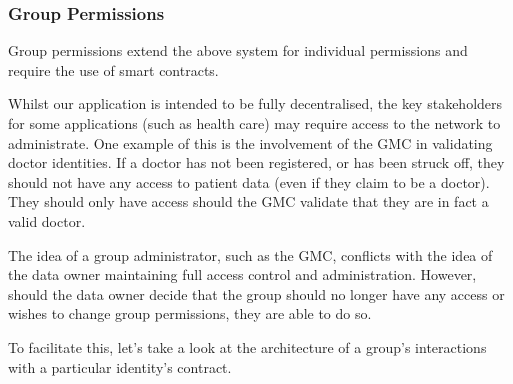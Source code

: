 \subsubsection{Group Permissions}

Group permissions extend the above system for individual permissions and require the use of smart contracts. 

Whilst our application is intended to be fully decentralised, the key stakeholders for some applications (such as health care) may require access to the network to administrate. One example of this is the involvement of the GMC in validating doctor identities. If a doctor has not been registered, or has been struck off, they should not have any access to patient data (even if they claim to be a doctor). They should only have access should the GMC validate that they are in fact a valid doctor.

The idea of a group administrator, such as the GMC, conflicts with the idea of the data owner maintaining full access control and administration. However, should the data owner decide that the group should no longer have any access or wishes to change group permissions, they are able to do so.

To facilitate this, let's take a look at the architecture of a group's interactions with a particular identity's contract.



